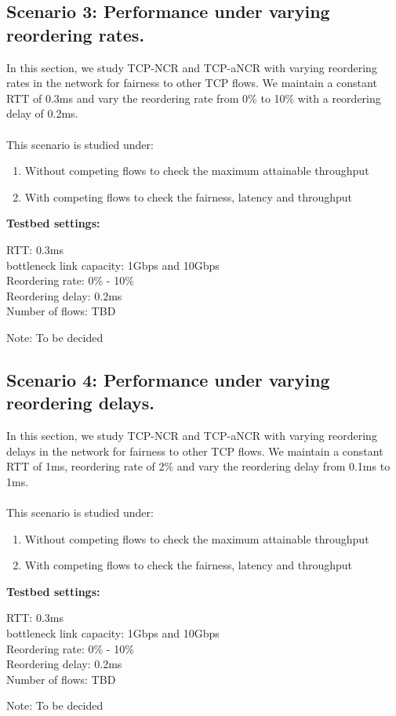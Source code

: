 \subsection{Scenario 3: Performance under varying reordering rates.\label{ss:dc3}}
In this section, we study TCP-NCR and TCP-aNCR with varying reordering rates in the network for fairness to other TCP flows. We maintain a constant RTT of 0.3ms and vary the reordering rate from 0\% to 10\% with a reordering delay of 0.2ms.
\\
\\
This scenario is studied under:
\begin{enumerate}
    \item Without competing flows to check the maximum attainable throughput
    \item With competing flows to check the fairness, latency and throughput
\end{enumerate}

\textbf{Testbed settings:}
\begin{tabbing}
\quad RTT: 0.3ms\\
\quad bottleneck link capacity: 1Gbps and 10Gbps \\
\quad Reordering rate: 0\% - 10\% \\
\quad Reordering delay: 0.2ms \\
\quad Number of flows: TBD \\
\end{tabbing}
Note: To be decided\\

\subsection{Scenario 4: Performance under varying reordering delays.\label{ss:dc54}}
In this section, we study TCP-NCR and TCP-aNCR with varying reordering delays in the network for fairness to other TCP flows. We maintain a constant RTT of 1ms, reordering rate of 2\% and vary the reordering delay from 0.1ms to 1ms.
\\
\\
This scenario is studied under:
\begin{enumerate}
    \item Without competing flows to check the maximum attainable throughput
    \item With competing flows to check the fairness, latency and throughput
\end{enumerate}
\textbf{Testbed settings:}
\begin{tabbing}
\quad RTT: 0.3ms\\
\quad bottleneck link capacity: 1Gbps and 10Gbps \\
\quad Reordering rate: 0\% - 10\% \\
\quad Reordering delay: 0.2ms \\
\quad Number of flows: TBD \\
\end{tabbing}
Note: To be decided\\
